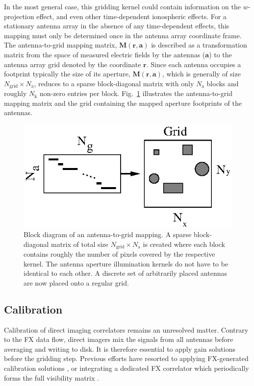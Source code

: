 \documentclass[a4paper,fleqn,usenatbib]{../mnras}
\begin{document}
In the most general case, this gridding kernel could contain information on the
$w$-projection effect, and even other time-dependent ionospheric effects. For a
stationary antenna array in the absence of any time-dependent effects, this
mapping must only be determined once in the antenna array coordinate frame. The
antenna-to-grid mapping matrix, $\mathbf{M}(\mathbf{r},\mathbf{a})$ is described
as a transformation matrix from the space of measured electric fields by the antennas
($\mathbf{a}$) to the antenna array grid denoted by the coordinate $\mathbf{r}$. Since each
antenna occupies a footprint typically the size of its aperture,
$\mathbf{M}(\mathbf{r},\mathbf{a})$, which is generally of size
$N_\textrm{grid}\times N_\textrm{a}$, reduces to a sparse block-diagonal matrix
with only $N_\textrm{a}$ blocks and roughly $N_\textrm{k}$ non-zero entries per
block. Fig.~\ref{fig:a2g-mapping} illustrates the antenna-to-grid mapping
matrix and the grid containing the mapped aperture footprints of the antennas.

\begin{figure}
  \includegraphics[width=\columnwidth]{a2g_mapping.eps}
  \caption{Block diagram of an antenna-to-grid mapping. A sparse block-diagonal
    matrix of total size $N_\textrm{grid}\times N_\textrm{a}$ is created where each
    block contains roughly the number of pixels covered by the respective kernel.
    The antenna aperture illumination kernels do not have to be identical to each
    other. A discrete set of arbitrarily placed antennas are now placed onto a
    regular grid.}
  \label{fig:a2g-mapping}
\end{figure}

\subsection{Calibration}
Calibration of direct imaging correlators remains an unresolved matter. Contrary
to the FX data flow, direct imagers mix the signals from all antennas before
averaging and writing to disk. It is therefore essential to apply gain solutions 
before the gridding step. Previous efforts have resorted to applying FX-generated
calibration solutions \citep{zhe14, fos14}, or integrating a dedicated FX correlator 
which periodically forms the full visibility matrix \citep{wij09, dev09}. 
\end{document}
